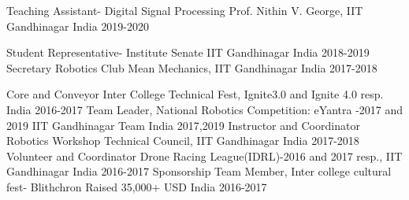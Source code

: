 

\begin{cvhonors}
  \cvhonor
    {Teaching Assistant- Digital Signal Processing} %
    {Prof. Nithin V. George, IIT Gandhinagar} %
    {India} %
    {2019-2020} %

  \cvhonor
    {Student Representative- Institute Senate} %
    {IIT Gandhinagar} %
    {India} %
    {2018-2019} %
  \cvhonor
    {Secretary Robotics Club} %
    {Mean Mechanics, IIT Gandhinagar  } %
    {India} %
    {2017-2018} %

  \cvhonor
    {Core and Conveyor} %
    {Inter College Technical Fest, Ignite3.0 and Ignite 4.0 resp.} %
    {India} %
    {2016-2017} %
    \cvhonor
    {Team Leader, National Robotics Competition: eYantra -2017 and 2019} %
    {IIT Gandhinagar Team}%
    {India} %
    {2017,2019} %
  \cvhonor
    {Instructor and Coordinator Robotics Workshop} %
    {Technical Council, IIT Gandhinagar } %
    {India} %
    {2017-2018} %
  \cvhonor
    {Volunteer and Coordinator} %
    {Drone Racing League(IDRL)-2016 and 2017 resp., IIT Gandhinagar} %
    {India} %
    {2016-2017} %
\cvhonor
    {Sponsorship Team Member, Inter college cultural fest- Blithchron} %
    {Raised 35,000+ USD} %
    {India} %
    {2016-2017} %
\end{cvhonors}


